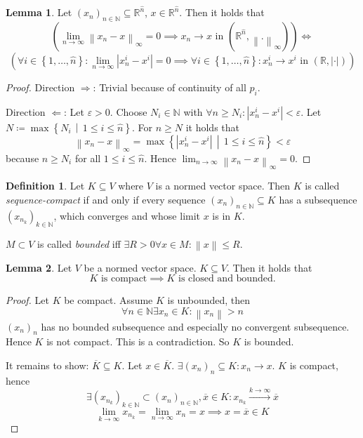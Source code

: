 \documentclass[a4paper,landscape,twocolumn]{article}
\theoremstyle{definition}
\newtheorem{defi}{Definition}
\newtheorem{lemma}{Lemma}
\newcommand\set[1]{\left\{#1\right\}}
\newcommand\setdef[2]{\left\{#1\,\middle|\,#2\right\}}
\newcommand\abs[1]{\left|#1\right|}
\newcommand\norm[1]{\left\|#1\right\|}
\newcommand\inorm[1]{\left\|#1\right\|_\infty}
\begin{document}
\begin{lemma}
  Let $(x_n)_{n\in\mathbb N} \subseteq \mathbb R^{\hat{n}}$, $x \in \mathbb R^{\hat{n}}$.
  Then it holds that
  \[
  \left(\lim_{n\to\infty} \inorm{x_n - x} = 0 \implies x_n \to x \text{ in } (\mathbb R^{\hat{n}}, \inorm{.})\right) \iff \]
  \[
  \left(\forall i \in \set{1, \ldots, \hat n}: \lim_{n\to\infty} \abs{x_n^i - x^i} = 0 \implies \forall i \in \set{1, \ldots, \hat n}: x_n^i \to x^i \text{ in } (\mathbb R, \abs{\cdot})\right)
  \]
\end{lemma}
\begin{proof}
  Direction $\Rightarrow$: Trivial because of continuity of all $p_i$.

  Direction $\Leftarrow$: Let $\varepsilon > 0$.
  Choose $N_i \in \mathbb N$ with $\forall n \geq N_i: \abs{x_n^i - x^i} < \varepsilon$.
  Let $N \coloneqq \max\setdef{N_i}{1 \leq i \leq \hat n}$. For $n \geq N$ it holds that
  \[ \inorm{x_n - x} = \max\setdef{\abs{x_n^i - x^i}}{1 \leq i \leq \hat n} < \varepsilon \]
  because $n \geq N_i$ for all $1 \leq i \leq \hat n$. Hence $\lim_{n\to\infty} \inorm{x_n - x} = 0$.
\end{proof}

\begin{defi}
  Let $K \subseteq V$ where $V$ is a normed vector space. Then $K$ is called \emph{sequence-compact} if and only if every sequence $(x_n)_{n\in\mathbb N} \subseteq K$ has a subsequence $(x_{n_k})_{k \in \mathbb N}$, which converges and whose limit $x$ is in $K$.

  $M \subset V$ is called \emph{bounded} iff $\exists R > 0 \forall x \in M: \norm{x} \leq R$.
\end{defi}

\begin{lemma}
  Let $V$ be a normed vector space. $K \subseteq V$. Then it holds that
  \[ K \text{ is compact} \implies K \text{ is closed and bounded}. \]
\end{lemma}
\begin{proof}
  Let $K$ be compact. Assume $K$ is unbounded, then
  \[ \forall n \in \mathbb N \exists x_n \in K: \norm{x_n} > n \]
  $(x_n)_n$ has no bounded subsequence and especially no convergent subsequence.
Hence $K$ is not compact. This is a contradiction. So $K$ is bounded.

  It remains to show: $\overline{K} \subseteq K$. Let $x \in \overline{K}$.
  $\exists (x_n)_n \subseteq K: x_n \to x$. $K$ is compact, hence
  \[ \exists (x_{n_k})_{k\in\mathbb N} \subset (x_n)_{n\in\mathbb N}, \overline{x} \in K: x_{n_k} \overset{k \to \infty}{\longrightarrow} \overline{x} \]
  \[ \lim_{k\to\infty} x_{n_k} = \lim_{n\to\infty} x_n = x \implies x = \overline{x} \in K \]
\end{proof}
\end{document}
